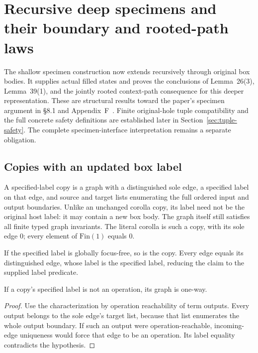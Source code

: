 \section{Recursive deep specimens and their boundary and rooted-path laws}
\label{sec:deep-specimens}
The shallow specimen construction now extends recursively through original
box bodies. It supplies actual filled states and proves the conclusions of
Lemma~26(3), Lemma~39(1), and the jointly rooted context-path consequence for
this deeper representation. These are structural results toward the paper's
specimen argument in \S8.1 and Appendix~F~\cite{paper}. Finite original-hole tuple compatibility and the full concrete safety
definitions are established later in Section~\ref{sec:tuple-safety}. The
complete specimen-interface interpretation remains a separate obligation.

\subsection{Copies with an updated box label}
\begin{definition}\label{term:label-copy}
A specified-label copy is a graph with a distinguished sole edge, a
specified label on that edge, and source and target lists enumerating the
full ordered input and output boundaries. Unlike an unchanged corolla
copy, its label need not be the original host label: it may contain a
new box body. The graph itself still satisfies all finite typed graph
invariants. The literal corolla is such a copy, with its sole edge $0$;
every element of $\mathrm{Fin}(1)$ equals $0$.
\end{definition}

If the specified label is globally focus-free, so is the copy.
Every edge equals its distinguished edge, whose label is the specified
label, reducing the claim to the supplied label predicate.

\begin{lemma}
If a copy's specified label is not an operation, its graph is one-way.
\end{lemma}
\begin{proof}
Use the characterization by operation reachability of term outputs.
Every output belongs to the sole edge's target list, because that list
enumerates the whole output boundary. If such an output were
operation-reachable, incoming-edge uniqueness would force that edge
to be an operation. Its label equality contradicts the hypothesis.
\end{proof}

